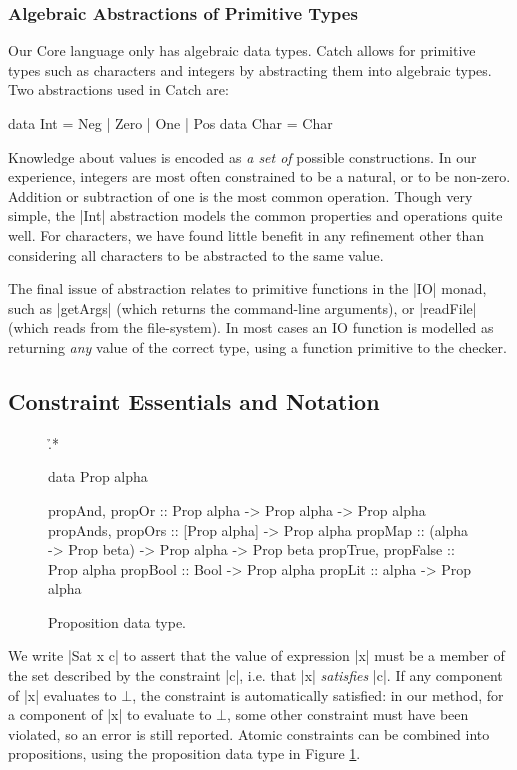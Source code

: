 \documentclass[preprint]{sigplanconf}
\begin{document}
\subsubsection{Algebraic Abstractions of Primitive Types}
\label{sec:abstraction}

Our Core language only has algebraic data types. Catch allows for primitive types such as characters and integers by abstracting them into algebraic types. Two abstractions used in Catch are:

\ignore\begin{code}
data Int = Neg | Zero | One | Pos
data Char = Char
\end{code}

Knowledge about values is encoded as \textit{a set of} possible constructions. In our experience, integers are most often constrained to be a natural, or to be non-zero. Addition or subtraction of one is the most common operation. Though very simple, the |Int| abstraction models the common properties and operations quite well. For characters, we have found little benefit in any refinement other than considering all characters to be abstracted to the same value.

The final issue of abstraction relates to primitive functions in the |IO| monad, such as |getArgs| (which returns the command-line arguments), or |readFile| (which reads from the file-system). In most cases an IO function is modelled as returning \textit{any} value of the correct type, using a function primitive to the checker.

\subsection{Constraint Essentials and Notation}
\label{sec:constraints}

\begin{figure}
\h{.*}\begin{code}
data Prop alpha

propAnd, propOr           :: Prop alpha -> Prop alpha -> Prop alpha
propAnds, propOrs         :: [Prop alpha] -> Prop alpha
propMap                   :: (alpha -> Prop beta) -> Prop alpha -> Prop beta
propTrue, propFalse       :: Prop alpha
propBool                  :: Bool -> Prop alpha
propLit                   :: alpha -> Prop alpha
\end{code}
\caption{Proposition data type.}
\label{fig:prop}
\end{figure}

We write |Sat x c| to assert that the value of expression |x| must be a member of the set described by the constraint |c|, i.e. that |x| \textit{satisfies} |c|. If any component of |x| evaluates to $\bot{}$, the constraint is automatically satisfied: in our method, for a component of |x| to evaluate to $\bot{}$, some other constraint must have been violated, so an error is still reported. Atomic constraints can be combined into propositions, using the proposition data type in Figure \ref{fig:prop}.
\end{document}
